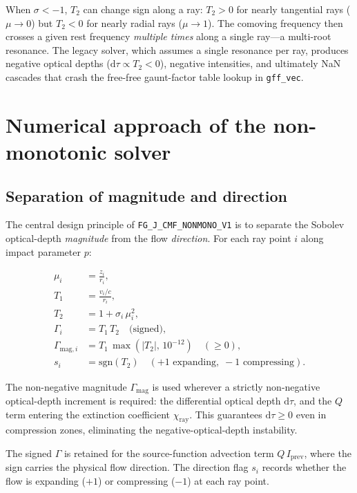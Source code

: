 \documentclass[11pt,a4paper]{article}
\begin{document}
When $\sigma < -1$, $T_2$ can change sign along a ray: $T_2 > 0$ for
nearly tangential rays ($\mu \to 0$) but $T_2 < 0$ for nearly radial
rays ($\mu \to 1$).  The comoving frequency then crosses a given rest
frequency \emph{multiple times} along a single ray---a multi-root
resonance.  The legacy solver, which assumes a single resonance per
ray, produces negative optical depths ($\mathrm{d}\tau \propto T_2 < 0$),
negative intensities, and ultimately NaN cascades that crash the free-free
gaunt-factor table lookup in \texttt{gff\_vec}.

\section{Numerical approach of the non-monotonic solver}

\subsection{Separation of magnitude and direction}

The central design principle of \texttt{FG\_J\_CMF\_NONMONO\_V1} is to
separate the Sobolev optical-depth \emph{magnitude} from the flow
\emph{direction}.  For each ray point $i$ along impact parameter $p$:

\begin{align}
  \mu_i &= \frac{z_i}{r_i} , \\
  T_1 &= \frac{v_i/c}{r_i} , \\
  T_2 &= 1 + \sigma_i\,\mu_i^2 , \\
  \Gamma_i &= T_1\,T_2 \quad \text{(signed)}, \\
  \Gamma_{\mathrm{mag},i} &= T_1\,\max(|T_2|,\,10^{-12}) \quad (\geq 0), \\
  s_i &= \mathrm{sgn}(T_2) \quad (+1 \text{ expanding},\; -1 \text{ compressing}).
  \label{eq:gammagam}
\end{align}

The non-negative magnitude $\Gamma_{\mathrm{mag}}$ is used wherever a
strictly non-negative optical-depth increment is required: the
differential optical depth $\mathrm{d}\tau$, and the $Q$ term entering
the extinction coefficient $\chi_{\mathrm{ray}}$.  This guarantees
$\mathrm{d}\tau \geq 0$ even in compression zones, eliminating the
negative-optical-depth instability.

The signed $\Gamma$ is retained for the source-function advection term
$Q\,I_{\mathrm{prev}}$, where the sign carries the physical flow
direction.  The direction flag $s_i$ records whether the flow is
expanding ($+1$) or compressing ($-1$) at each ray point.
\end{document}

